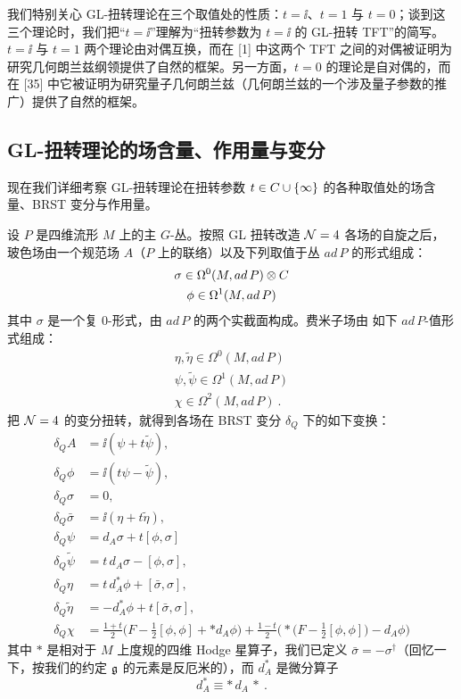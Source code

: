 
我们特别关心 GL-扭转理论在三个取值处的性质：$t=\ii$、$t=1$ 与 $t=0$；谈到这三个理论时，我们把“$t=\ii$”理解为“扭转参数为 $t=\ii$ 的 GL-扭转 TFT”的简写。$t=\ii$ 与 $t=1$ 两个理论由对偶互换，而在 [1] 中这两个 TFT 之间的对偶被证明为研究几何朗兰兹纲领提供了自然的框架。另一方面，$t=0$ 的理论是自对偶的，而在 [35] 中它被证明为研究量子几何朗兰兹（几何朗兰兹的一个涉及量子参数的推广）提供了自然的框架。

\subsection{GL-扭转理论的场含量、作用量与变分}

现在我们详细考察 GL-扭转理论在扭转参数 $t\in C\cup\{\infty\}$ 的各种取值处的场含量、BRST 变分与作用量。

设 $P$ 是四维流形 $M$ 上的主 $G$-丛。按照 GL 扭转改造 $\mathcal{N}=4$ 各场的自旋之后，玻色场由一个规范场 $A$（$P$ 上的联络）以及下列取值于丛 $ad\,P$ 的形式组成：
\begin{gather*}
\sigma \in \Omega^0(M, ad\,P)\otimes C \\
\phi \in \Omega^1(M, ad\,P)
\end{gather*}
其中 $\sigma$ 是一个复 0-形式，由 $ad\,P$ 的两个实截面构成。费米子场由
如下 $ad\,P$-值形式组成：
\begin{gather*}
\eta,\tilde\eta \in \Omega^0(M, ad\,P) \\
\psi,\tilde\psi \in \Omega^1(M, ad\,P) \\
\chi \in \Omega^2(M, ad\,P) \ .
\end{gather*}
把 $\mathcal{N}=4$ 的变分扭转，就得到各场在 BRST 变分 $\delta_Q$ 下的如下变换：
\begin{align*}
\delta_QA &= \ii(\psi+t\tilde\psi), \\
\delta_Q\phi &= \ii(t\psi-\tilde\psi), \\
\delta_Q\sigma &= 0, \\
\delta_Q\bar\sigma &= \ii(\eta+t\tilde\eta), \\
\delta_Q\psi &= d_A\sigma + t[\phi,\sigma] \\
\delta_Q\tilde\psi &= t\,d_A\sigma - [\phi,\sigma], \\
\delta_Q\eta &= t\,d_A^*\phi + [\bar\sigma,\sigma], \\
\delta_Q\tilde\eta &= -d_A^*\phi + t[\bar\sigma,\sigma], \\
\delta_Q\chi &= \frac{1+t}{2}\Big(F-\frac{1}{2}[\phi,\phi]+*d_A\phi\Big) + \frac{1-t}{2}\Big(*\big(F-\frac{1}{2}[\phi,\phi]\big)-d_A\phi\Big)
\end{align*}
其中 $*$ 是相对于 $M$ 上度规的四维 Hodge 星算子，我们已定义 $\bar\sigma=-\sigma^\dagger$（回忆一下，按我们的约定 $\mathfrak{g}$ 的元素是反厄米的），而 $d_A^*$ 是微分算子
\[ d_A^* \equiv *\,d_A\,* \ . \]

